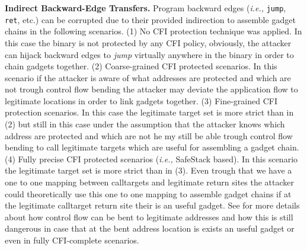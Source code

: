 
\textbf{Indirect Backward-Edge Transfers.} 
Program backward edges (\textit{i.e.,} \texttt{jump}, \texttt{ret}, etc.) can be corrupted due to their provided indirection to assemble gadget chains in the following scenarios.
(1) No CFI protection technique was applied. In this case the binary is not protected by any CFI policy, obviously, the attacker can hijack backward edges to \textit{jump} virtually 
anywhere in the binary in order to chain gadgets together.
(2) Coarse-grained CFI protected scenarios. In this scenario if the attacker is aware of what addresses are protected and which are not trough control flow bending the attacker may deviate
the application flow to legitimate locations in order to link gadgets together.
(3) Fine-grained CFI protection scenarios. In this case the legitimate target set is more strict than in (2) but still in this case under the assumption that the attacker knows
which address are protected and which are not he my still be able trough control flow bending to call legitimate targets which are useful for assembling a gadget chain.
(4) Fully precise CFI protected scenarios (\textit{i.e.,} SafeStack \cite{volodymyr:cpi} based). In this scenario the legitimate target set is more strict than in (3). Even trough that we 
have a one to one mapping 
between calltargets and legitimate return sites the attacker could theoretically use this one to one mapping to assemble gadget chains if at the legitimate calltarget return site their is an useful gadget. 
See \cite{carlini:bending} for more details about how control flow can be bent to legitimate addresses and how this is still dangerous in 
case that at the bent address location is exists an useful gadget or even in fully CFI-complete scenarios. 

